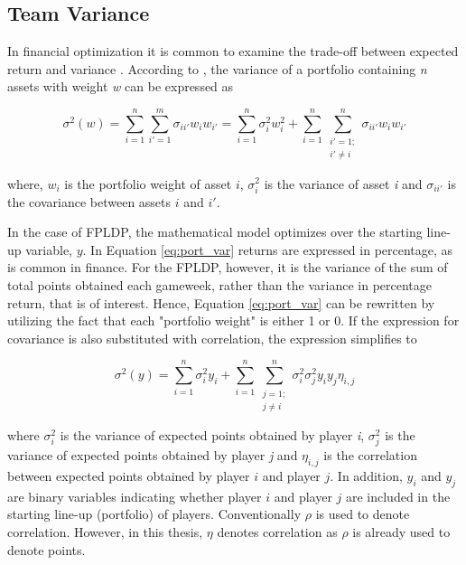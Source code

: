 \subsection{Team Variance}

In financial optimization it is common to examine the trade-off between expected return and variance \citep{Markowitz}. According to \cite{Zenios}, the variance of a portfolio containing \textit{n} assets with weight \textit{w} can be expressed as 

\begin{equation}
    \sigma^2(w) = \sum_{i = 1}^{n}\sum_{i' = 1}^{m}\sigma_{ii'}w_{i}w_{i'} = \sum_{i = 1}^{n}\sigma_{i}^2w_i^2 + \sum_{i = 1}^{n}\sum_{\substack{i' = 1;\\ i' \neq i}}^{n}\sigma_{ii'}w_iw_{i'}
    \label{eq:port_var}
\end{equation}

where, $w_i$ is the portfolio weight of asset $i$, $\sigma_{i}^2$ is the variance of asset \textit{i} and $\sigma_{ii'}$ is the covariance between assets $i$ and $i'$. 

\newpar

In the case of FPLDP, the mathematical model optimizes over the starting line-up variable, $y$. In Equation \ref{eq:port_var} returns are expressed in percentage, as is common in finance.  
For the FPLDP, however, it is the variance of the sum of total points obtained each gameweek, rather than the variance in percentage return, that is of interest. Hence, Equation \ref{eq:port_var} can be rewritten by utilizing the fact that each "portfolio weight" is either 1 or 0. If the expression for covariance is also substituted with correlation, the expression simplifies to


\begin{equation}
    \sigma^2(y) = \sum_{i = 1}^{n}\sigma_i^2y_i + \sum_{i = 1}^{n}\sum_{\substack{j = 1;\\ j \neq i}}^{n} \sigma_i^{2}\sigma_j^{2}y_{i}y_{j}\eta_{i,j}
    \label{eq:team_var}
\end{equation}

where $\sigma_{i}^2$ is the variance of expected points obtained by player \textit{i}, $\sigma_{j}^2$ is the variance of expected points obtained by player \textit{j} and $\eta_{i,j}$ is the correlation between expected points obtained by player $i$ and player $j$. In addition, $y_i$ and $y_j$ are binary variables indicating whether player $i$ and player $j$ are included in the starting line-up (portfolio) of players. Conventionally $\rho$ is used to denote correlation. However, in this thesis, $\eta$ denotes correlation as $\rho$ is already used to denote points. \newline


